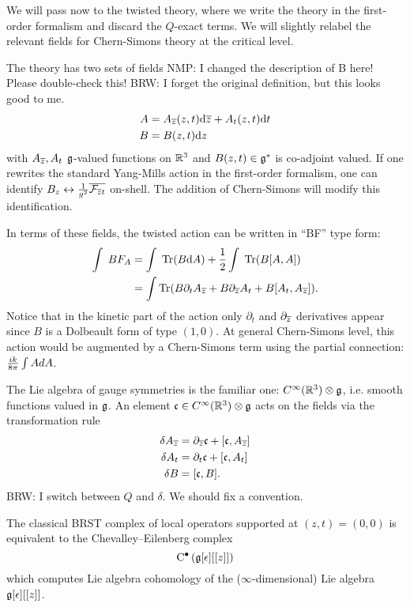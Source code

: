 \documentclass[11pt]{amsart}
\def\brian#1{{\textcolor{blue!65!red}{BRW: {#1}}}}
\def\natalie#1{{\textcolor{green!65!black}{NMP: {#1}}}}
\begin{document}
We will pass now to the twisted theory, where we write the theory in the first-order formalism and discard the $Q$-exact terms. We will slightly relabel the relevant fields for Chern-Simons theory at the critical level. 

The theory has two sets of fields \natalie{I changed the description of B here! Please double-check this!}
\brian{I forget the original definition, but this looks good to me.}
\begin{align*}
A & = A_{{\overline{z}}} (z,t) {\rm d} {\overline{z}} + A_{t} (z, t) {\rm d} t \\
B & = B (z,t) {\rm d} z 
\end{align*}
with $A_{{\overline{z}}}, A_t$ $\mathfrak g$-valued functions on $\mathbb R^3$ and $B(z,t) \in \mathfrak g^*$ is co-adjoint valued. If one rewrites the standard Yang-Mills action in the first-order formalism, one can identify $B_z \leftrightarrow {1 \over g^2} \overline{\mathcal F_{{\overline{z}} t}}$ on-shell. The addition of Chern-Simons will modify this identification. 


In terms of these fields, the twisted action can be written in ``BF'' type form:
\begin{align*}
\int \; B F_A & = \int \; \operatorname{Tr}(B {\rm d} A) +  \frac12 \int \; \operatorname{Tr}(B [A,A]) \\
& = \int \operatorname{Tr}(B \partial_t A_{{\overline{z}}} + B \partial_{{\overline{z}}} A_t + B [A_t, A_{\overline{z}}]) .
\end{align*}
Notice that in the kinetic part of the action only $\partial_t$ and $\partial_{{\overline{z}}}$ derivatives appear since $B$ is a Dolbeault form of type $(1,0)$. At general Chern-Simons level, this action would be augmented by a Chern-Simons term using the partial connection: ${i k \over 8 \pi} \int A d A$.

The Lie algebra of gauge symmetries is the familiar one: $C^\infty(\mathbb R^3) \otimes \mathfrak g$, i.e. smooth functions valued in $\mathfrak g$. 
An element $\mathfrak c \in C^\infty(\mathbb R^3) \otimes \mathfrak g$ acts on the fields via the transformation rule
\begin{align*}
\delta A_{\overline{z}} & = \partial_{{\overline{z}}} \mathfrak c + [\mathfrak c, A_{\overline{z}}] \\
\delta A_t & = \partial_t \mathfrak c + [\mathfrak c,A_t] \\
\delta B & = [\mathfrak c, B] .
\end{align*}
\brian{I switch between $Q$ and $\delta$. We should fix a convention.}

The classical BRST complex of local operators supported at $(z,t) = (0,0)$ is equivalent to the Chevalley--Eilenberg complex
\[
{\rm C}^\bullet \left(\mathfrak g[\epsilon][[z]]\right)
\] 
which computes Lie algebra cohomology of the ($\infty$-dimensional) Lie algebra $\mathfrak g[\epsilon][[z]]$. 
\end{document}
